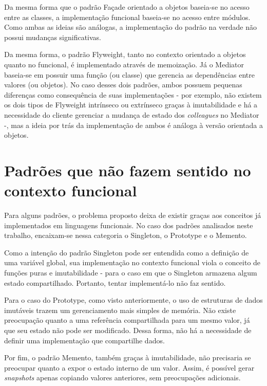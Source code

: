 Da mesma forma que o padrão Façade orientado 
a objetos baseia-se no acesso entre as classes, 
a implementação funcional baseia-se no acesso 
entre módulos. Como ambas as ideias são 
análogas, a implementação do padrão na verdade 
não possui mudanças significativas. 

Da mesma forma, o padrão Flyweight, tanto no 
contexto orientado a objetos quanto no funcional, 
é implementado através de memoização. Já o Mediator 
baseia-se em possuir uma função (ou classe) que 
gerencia as dependências entre valores (ou objetos). 
No caso desses dois padrões, ambos possuem 
pequenas diferenças como consequência de suas 
implementações - por exemplo, não existem os dois 
tipos de Flyweight intrínseco ou extrínseco 
graças à imutabilidade e há a necessidade do 
cliente gerenciar a mudança de estado dos 
\textit{colleagues} no Mediator -, mas a ideia 
por trás da implementação de ambos é análoga 
à versão orientada a objetos.

\section{Padrões que não fazem sentido no contexto funcional}

Para alguns padrões, o problema proposto deixa 
de existir graças aos conceitos já implementados 
em linguagens funcionais. No caso dos padrões 
analisados neste trabalho, encaixam-se nessa 
categoria o Singleton, o Prototype e o Memento. 

Como a intenção do padrão Singleton pode 
ser entendida como a definição de uma variável 
global, sua implementação no contexto funcional 
viola o conceito de funções puras e imutabilidade - 
para o caso em que o Singleton armazena algum 
estado compartilhado. Portanto, tentar 
implementá-lo não faz sentido. 

Para o caso do Prototype, como visto anteriormente, 
o uso de estruturas de dados imutáveis trazem um 
gerenciamento mais simples de memória. Não existe 
preocupação quanto a uma referência compartilhada 
para um mesmo valor, já que seu estado não pode ser 
modificado. Dessa forma, não há a necessidade de 
definir uma implementação que compartilhe dados.

Por fim, o padrão Memento, também graças à 
imutabilidade, não precisaria se preocupar quanto 
a expor o estado interno de um valor. Assim, é 
possível gerar \textit{snapshots} apenas copiando 
valores anteriores, sem preocupações adicionais. 

